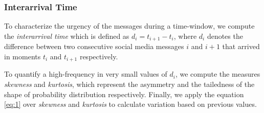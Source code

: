 \documentclass{llncs}
\begin{document}
\subsubsection{Interarrival Time}

To characterize the urgency of the messages during a time-window, we compute the \textit{interarrival time} which is defined as $d_{i} = t_{i+1} - t_{i}$, where $d_{i}$ denotes the difference between two consecutive social media messages $i$ and $i+1$ that arrived in moments $t_{i}$ and $t_{i+1}$ respectively. 


To quantify a high-frequency in very small values of $d_{i}$, we compute the measures \textit{skewness} and \textit{kurtosis}, which represent the asymmetry and the tailedness of the shape of probability distribution respectively. Finally, we apply the equation \ref{eq:1} over \textit{skewness} and \textit{kurtosis} to calculate variation based on previous values.


\end{document}
